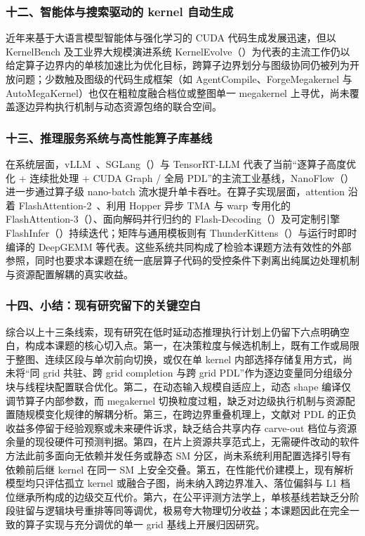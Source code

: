 \subsubsection*{十二、智能体与搜索驱动的 kernel 自动生成}

近年来基于大语言模型智能体与强化学习的 CUDA 代码生成发展迅速，但以 KernelBench 及工业界大规模演进系统 KernelEvolve（）为代表的主流工作仍以给定算子边界内的单核加速比为优化目标，跨算子边界划分与图级协同仍被列为开放问题；少数触及图级的代码生成框架（如 AgentCompile、ForgeMegakernel 与 AutoMegaKernel）也仅在粗粒度融合档位或整图单一 megakernel 上寻优，尚未覆盖逐边异构执行机制与动态资源包络的联合空间。

\subsubsection*{十三、推理服务系统与高性能算子库基线}

在系统层面，vLLM~\pVllm、SGLang（）与 TensorRT-LLM 代表了当前“逐算子高度优化 + 连续批处理 + CUDA Graph / 全局 PDL”的主流工业基线，NanoFlow（）进一步通过算子级 nano-batch 流水提升单卡吞吐。在算子实现层面，attention 沿着 FlashAttention-2~\pFA、利用 Hopper 异步 TMA 与 warp 专用化的 FlashAttention-3（）、面向解码并行归约的 Flash-Decoding（）及可定制引擎 FlashInfer（）持续迭代；矩阵与通用模板则有 ThunderKittens（）与运行时即时编译的 DeepGEMM 等代表。这些系统共同构成了检验本课题方法有效性的外部参照，同时也要求本课题在统一底层算子代码的受控条件下剥离出纯属边处理机制与资源配置解耦的真实收益。

\subsubsection*{十四、小结：现有研究留下的关键空白}

综合以上十三条线索，现有研究在低时延动态推理执行计划上仍留下六点明确空白，构成本课题的核心切入点。第一，在决策粒度与候选机制上，既有工作或局限于整图、连续区段与单次前向切换，或仅在单 kernel 内部选择存储复用方式，尚未将“同 grid 共驻、跨 grid completion 与跨 grid PDL”作为逐边变量同分组级分块与线程块配置联合优化。第二，在动态输入规模自适应上，动态 shape 编译仅调节算子内部参数，而 megakernel 切换粒度过粗，缺乏对边级执行机制与资源配置随规模变化规律的解耦分析。第三，在跨边界重叠机理上，文献对 PDL 的正负收益多停留于经验观察或未来硬件诉求，缺乏结合共享内存 carve-out 档位与资源余量的现役硬件可预测判据。第四，在片上资源共享范式上，无需硬件改动的软件方法此前多面向无依赖并发任务或静态 SM 分区，尚未系统利用配置选择引导有依赖前后继 kernel 在同一 SM 上安全交叠。第五，在性能代价建模上，现有解析模型均只评估孤立 kernel 或融合子图，尚未纳入跨边界准入、落位偏斜与 L1 档位继承所构成的边级交互代价。第六，在公平评测方法学上，单核基线若缺乏分阶段驻留与逻辑块号重排等同等调优，极易夸大物理切分收益；本课题因此在完全一致的算子实现与充分调优的单一 grid 基线上开展归因研究。
